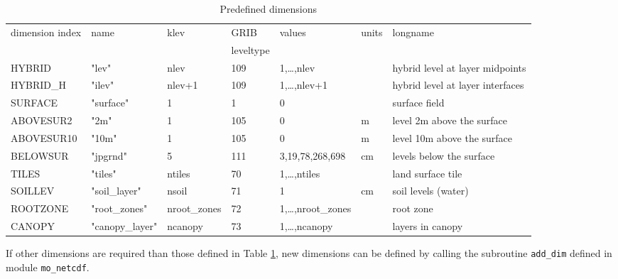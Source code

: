   \begin{table}[htb]
  {\small\begin{tabular}{|llllllp{2cm}|}
  \hline
  dimension index & name & klev & GRIB      & values & units & longname\\
                  &      &      & leveltype &        &       &\\
  \hline
  HYBRID     & "lev"     & nlev   & 109 & 1,\dots,nlev    &    & hybrid level at layer midpoints\\
  HYBRID\_H  & "ilev"    & nlev+1 & 109 & 1,\dots,nlev+1  &    & hybrid level at layer interfaces\\
  SURFACE    & "surface" & 1      &   1 & 0               &    & surface field\\
  ABOVESUR2  & "2m"      & 1      & 105 & 0               & m  & level 2m above the surface\\
  ABOVESUR10 & "10m"     & 1      & 105 & 0               & m  & level 10m above the surface\\
  BELOWSUR   & "jpgrnd"  & 5      & 111 & 3,19,78,268,698 & cm &
  levels below the surface\\
  TILES      & "tiles"   & ntiles & 70  & 1,\dots,ntiles &    & land
  surface tile\\ 
  SOILLEV    & "soil\_layer"& nsoil& 71  & 1              & cm & soil
  levels (water)\\ 
  ROOTZONE   & "root\_zones"& nroot\_zones& 72  & 1,\dots,nroot\_zones
  & & root zone \\
  CANOPY     & "canopy\_layer"& ncanopy & 73  & 1,\dots,ncanopy &    & layers in canopy \\
  \hline
  \end{tabular}}
  \caption{Predefined dimensions}
  \label{tab.dims}
  \end{table}

If other dimensions are required than those defined in Table
\ref{tab.dims}, new dimensions can be defined by calling the subroutine
{\tt add\_dim} defined in module {\tt mo\_netcdf}.

